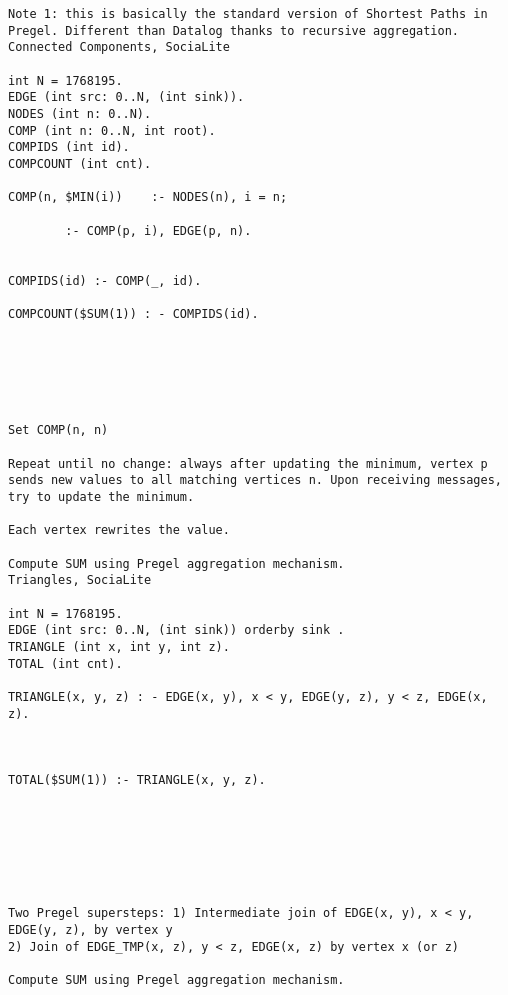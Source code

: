 \begin{verbatim}
Note 1: this is basically the standard version of Shortest Paths in Pregel. Different than Datalog thanks to recursive aggregation.
Connected Components, SociaLite

int N = 1768195.
EDGE (int src: 0..N, (int sink)).
NODES (int n: 0..N).
COMP (int n: 0..N, int root).
COMPIDS (int id).
COMPCOUNT (int cnt).

COMP(n, $MIN(i)) 	:- NODES(n), i = n;

		:- COMP(p, i), EDGE(p, n).


COMPIDS(id) :- COMP(_, id).

COMPCOUNT($SUM(1)) : - COMPIDS(id). 






Set COMP(n, n)

Repeat until no change: always after updating the minimum, vertex p sends new values to all matching vertices n. Upon receiving messages, try to update the minimum.

Each vertex rewrites the value.

Compute SUM using Pregel aggregation mechanism.
Triangles, SociaLite

int N = 1768195.
EDGE (int src: 0..N, (int sink)) orderby sink .
TRIANGLE (int x, int y, int z).
TOTAL (int cnt).

TRIANGLE(x, y, z) : - EDGE(x, y), x < y, EDGE(y, z), y < z, EDGE(x, z).



TOTAL($SUM(1)) :- TRIANGLE(x, y, z). 


	 	 	




Two Pregel supersteps: 1) Intermediate join of EDGE(x, y), x < y, EDGE(y, z), by vertex y
2) Join of EDGE_TMP(x, z), y < z, EDGE(x, z) by vertex x (or z)

Compute SUM using Pregel aggregation mechanism.




\end{verbatim}




